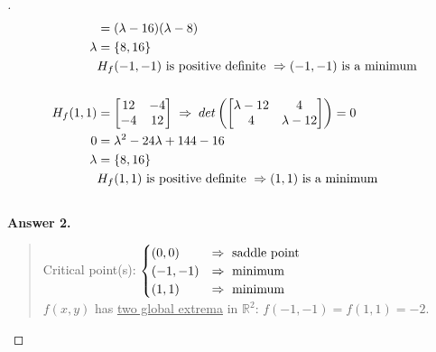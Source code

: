 \documentclass[12pt]{article}
\begin{document}
\begin{proof}[]
\begin{align*}
		 &= (\lambda - 16) (\lambda - 8) \\
		\lambda &= \left\lbrace 8, 16 \right\rbrace \\
		& H_f(-1, -1) \textnormal{ is positive definite } \Rightarrow (-1, -1) \textnormal{ is a minimum} \\[15pt]
		H_f(1, 1) &= \begin{bmatrix} 12 & -4 \\ -4 & 12 \end{bmatrix} \; \Rightarrow \; det\left( \begin{bmatrix} \lambda - 12 & 4 \\ 4 & \lambda - 12 \end{bmatrix} \right) = 0 \\
		0 &= \lambda^2  - 24 \lambda + 144 - 16 \\
		\lambda &= \left\lbrace 8, 16 \right\rbrace \\
		& H_f(1, 1) \textnormal{ is positive definite } \Rightarrow (1, 1) \textnormal{ is a minimum} \\[15pt]
	\end{align*} \vspace{-5mm}
	\textbf{Answer 2.} \vspace{-5mm} \\
	\begin{quote}
		Critical point(s): $ \begin{cases}
		(0,0) & \Rightarrow \textnormal{ saddle point} \\
		(-1, -1) & \Rightarrow \textnormal{ minimum} \\
		(1, 1) & \Rightarrow \textnormal{ minimum}
	\end{cases}	$ \\
		$f(x,y)$ has \underline{two global extrema} in $\mathbb{R}^2$: $f(-1, -1) = f(1, 1) = -2$.
	\end{quote}
\end{proof}
\end{document}
